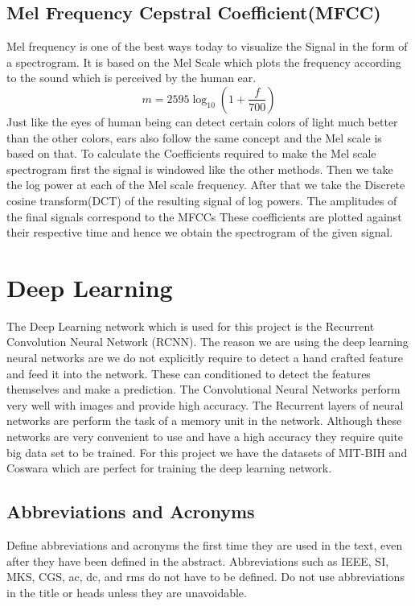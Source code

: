 \documentclass[conference]{IEEEtran}
\begin{document}
\subsection{Mel Frequency Cepstral Coefficient(MFCC)}

Mel frequency is one of the best ways today to visualize the Signal in the form of a spectrogram. It is based on the Mel Scale which plots the frequency according to the sound which is perceived by the human ear. 
\begin{equation}
    m = 2595\log_{10}{(1+\frac{f}{700})}
\end{equation}
Just like the eyes of human being can detect certain colors of light much better than the other colors, ears also follow the same concept and the Mel scale is based on that. To calculate the Coefficients required to make the Mel scale spectrogram first the signal is windowed like the other methods. Then we take the log power at each of the Mel scale frequency. After that we take the Discrete cosine transform(DCT) of the resulting signal of log powers. The amplitudes of the final signals correspond to the MFCCs These coefficients are plotted against their respective time and hence we obtain the spectrogram of the given signal. 

\section{Deep Learning}

The Deep Learning network which is used for this project is the Recurrent Convolution Neural Network (RCNN). The reason we are using the deep learning neural networks are we do not explicitly require to detect a hand crafted feature and feed it into the network. These can conditioned to detect the features themselves and make a prediction. The Convolutional Neural Networks perform very well with images and provide high accuracy. The Recurrent layers of neural networks are perform the task of a memory unit in the network. Although these networks are very convenient to use and have a high accuracy they require quite big data set to be trained. For this project we have the datasets of MIT-BIH and Coswara which are perfect for training the deep learning network.


\subsection{Abbreviations and Acronyms}\label{AA}
Define abbreviations and acronyms the first time they are used in the text, 
even after they have been defined in the abstract. Abbreviations such as 
IEEE, SI, MKS, CGS, ac, dc, and rms do not have to be defined. Do not use 
abbreviations in the title or heads unless they are unavoidable.
\end{document}

